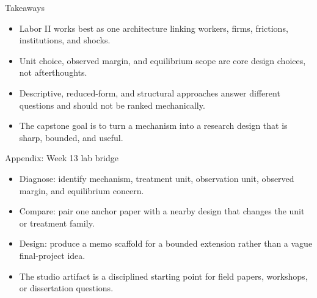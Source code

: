 \documentclass[aspectratio=169,11pt]{beamer}
\begin{document}
\begin{frame}{Takeaways}
\begin{itemize}
    \item Labor II works best as one architecture linking workers, firms, frictions, institutions, and shocks.
    \item Unit choice, observed margin, and equilibrium scope are core design choices, not afterthoughts.
    \item Descriptive, reduced-form, and structural approaches answer different questions and should not be ranked mechanically.
    \item The capstone goal is to turn a mechanism into a research design that is sharp, bounded, and useful.
\end{itemize}
\end{frame}

\appendix

\begin{frame}{Appendix: Week 13 lab bridge}
\begin{itemize}
    \item Diagnose: identify mechanism, treatment unit, observation unit, observed margin, and equilibrium concern.
    \item Compare: pair one anchor paper with a nearby design that changes the unit or treatment family.
    \item Design: produce a memo scaffold for a bounded extension rather than a vague final-project idea.
    \item The studio artifact is a disciplined starting point for field papers, workshops, or dissertation questions.
\end{itemize}
\end{frame}
\end{document}
